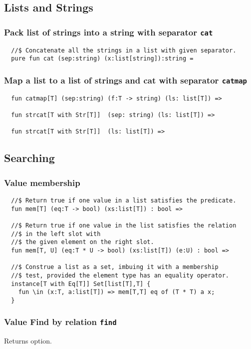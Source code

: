\documentclass[oneside]{book}
\begin{document}
\subsection{Lists and Strings}
\subsubsection{Pack list of strings into a string with separator {\tt cat}}
\begin{verbatim}
  //$ Concatenate all the strings in a list with given separator.
  pure fun cat (sep:string) (x:list[string]):string =
\end{verbatim}

\subsubsection{Map a list to a list of strings and cat with separator {\tt catmap}}
\begin{verbatim}
  fun catmap[T] (sep:string) (f:T -> string) (ls: list[T]) =>

  fun strcat[T with Str[T]]  (sep: string) (ls: list[T]) =>

  fun strcat[T with Str[T]]  (ls: list[T]) =>
\end{verbatim}

 
\subsection{Searching}
\subsubsection{Value membership}
\begin{verbatim}
  //$ Return true if one value in a list satisfies the predicate.
  fun mem[T] (eq:T -> bool) (xs:list[T]) : bool =>

  //$ Return true if one value in the list satisfies the relation 
  //$ in the left slot with 
  //$ the given element on the right slot.
  fun mem[T, U] (eq:T * U -> bool) (xs:list[T]) (e:U) : bool =>

  //$ Construe a list as a set, imbuing it with a membership
  //$ test, provided the element type has an equality operator.
  instance[T with Eq[T]] Set[list[T],T] {
    fun \in (x:T, a:list[T]) => mem[T,T] eq of (T * T) a x;
  }
\end{verbatim}

\subsubsection{Value Find by relation {\tt find}}
Returns option.
\end{document}
